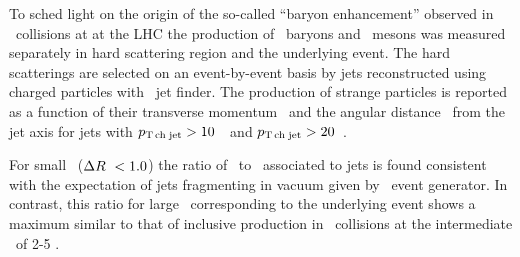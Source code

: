 
To sched light on the origin of the so-called ``baryon enhancement'' observed in \pPb\ collisions at  at the LHC the production of \lda\ baryons and \ks\ mesons was measured separately in hard scattering region and the underlying event.
The hard scatterings are selected on an event-by-event basis by jets reconstructed using charged particles with \akT\ jet finder. 
The production of strange particles is reported as a function of their transverse momentum \pt\ and the angular distance \dr\ from the jet axis for jets with $p_\mathrm{T\,ch\;jet} > 10$~\gevc\ and $p_\mathrm{T\,ch\;jet} > 20$~\gevc.


For small \dr\ ($\Delta R\ < 1.0$) the ratio of \lda\ to \ks\ associated to jets is found consistent with the expectation of jets fragmenting in vacuum given by \pythia\ event generator. 
In contrast, this ratio for large \dr\ corresponding to the underlying event shows a maximum similar to that of inclusive production in \pPb\ collisions at the intermediate \pt\ of 2-5 \gevc. 




